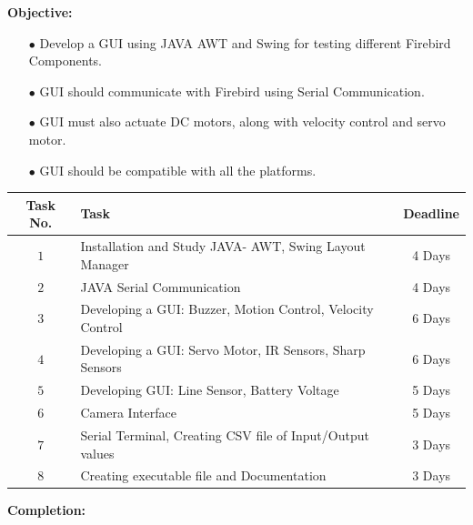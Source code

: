 \documentclass{article}
\begin{document}
	\newpage
	\textbf {\huge Objective:} \vspace{1cm}
	\begin{enumerate}
		\item [$\bullet$] Develop a GUI using JAVA AWT and Swing for testing different Firebird Components.\\
		\item [$\bullet$] GUI should communicate with Firebird using Serial Communication.\\
		\item [$\bullet$] GUI must also actuate DC motors, along with velocity control and servo motor.
		\item [$\bullet$] GUI should be compatible with all the platforms. 
	\end{enumerate}
	\vspace{1cm}
	\begin{center}
	\begin{tabular}{|c|p{2.5in}|c|}
		\hline
		\textbf{Task No.} & \qquad \qquad \qquad \qquad \textbf{Task} & \textbf{Deadline}\\
		\hline
		$1$ & Installation and Study JAVA- AWT, Swing Layout Manager & 4 Days\\
		\hline
		$2$ & JAVA Serial Communication & 4 Days\\
		\hline
		$3$ & Developing a GUI: Buzzer, Motion Control, Velocity Control & 6 Days\\
		\hline
		$4$ & Developing a GUI: Servo Motor, IR Sensors, Sharp Sensors & 6 Days\\
		\hline
		$5$ & Developing GUI: Line Sensor, Battery Voltage & 5 Days\\
		\hline
		$6$ & Camera Interface & 5 Days\\
		\hline
		$7$ & Serial Terminal, Creating CSV file of Input/Output values & 3 Days\\
		\hline
		$8$ & Creating executable file and Documentation & 3 Days\\
		\hline
	\end{tabular}
	\end{center}
	\newpage
	\textbf {\huge Completion:} \vspace{1cm}
\end{document}

